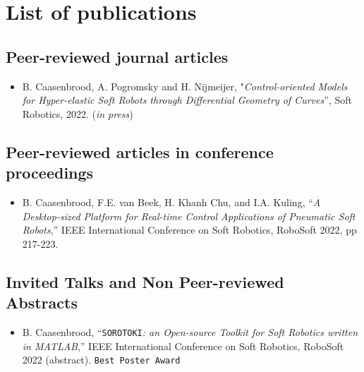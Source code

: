 \chapter*{List of publications}
\newcommand{\ipj}{(\textit{in preparation for journal submission})}
\newcommand{\cur}{(\textit{under review})}
\newcommand{\sbm}{(\textit{submitted})}
\newcommand{\acp}{(\textit{accepted})}
\newcommand{\inp}{(\textit{in press})}


\section*{Peer-reviewed journal articles}
\begin{itemize}[leftmargin=4mm]
	\item B. Caasenbrood, A. Pogromsky and H. Nijmeijer, "\textit{Control-oriented Models for Hyper-elastic Soft Robots through Differential Geometry of Curves}”, Soft Robotics, 2022. \inp
\end{itemize}

\section*{Peer-reviewed articles in conference proceedings}
\begin{itemize}[leftmargin=4mm]
	\item B. Caasenbrood, F.E. van Beek, H. Khanh Chu, and I.A. Kuling, “\textit{A Desktop-sized Platform for Real-time Control Applications of Pneumatic Soft Robots},” IEEE International Conference on Soft Robotics, RoboSoft 2022, pp 217-223.
\end{itemize}

\section*{Invited Talks and Non Peer-reviewed Abstracts}
\begin{itemize}[leftmargin=4mm]
	\item B. Caasenbrood, “\texttt{SOROTOKI}\textit{: an Open-source Toolkit for Soft Robotics written in MATLAB},”  IEEE International Conference on Soft Robotics, RoboSoft 2022 (abstract). \texttt{Best Poster Award}
\end{itemize}

